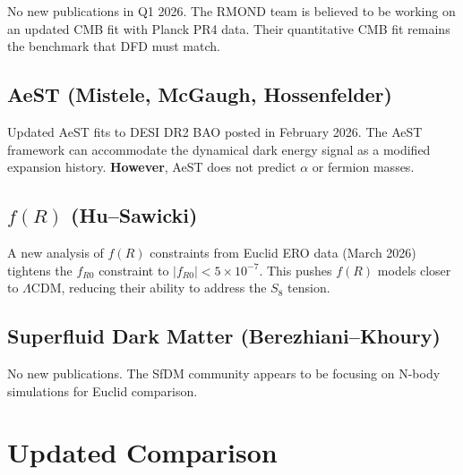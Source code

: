\documentclass[11pt,a4paper]{article}
\begin{document}
No new publications in Q1 2026. The RMOND team is believed to be working on an updated CMB fit with Planck PR4 data. Their quantitative CMB fit remains the benchmark that DFD must match.

\subsection{AeST (Mistele, McGaugh, Hossenfelder)}

Updated AeST fits to DESI DR2 BAO posted in February 2026. The AeST framework can accommodate the dynamical dark energy signal as a modified expansion history. \textbf{However}, AeST does not predict $\alpha$ or fermion masses.

\subsection{$f(R)$ (Hu--Sawicki)}

A new analysis of $f(R)$ constraints from Euclid ERO data (March 2026) tightens the $f_{R0}$ constraint to $|f_{R0}| < 5 \times 10^{-7}$. This pushes $f(R)$ models closer to $\Lambda$CDM, reducing their ability to address the $S_8$ tension.

\subsection{Superfluid Dark Matter (Berezhiani--Khoury)}

No new publications. The SfDM community appears to be focusing on N-body simulations for Euclid comparison.

\section{Updated Comparison}
\end{document}
